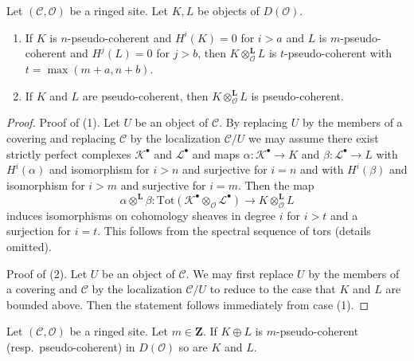 \begin{lemma}
\label{lemma-tensor-pseudo-coherent}
Let $(\mathcal{C}, \mathcal{O})$ be a ringed site. Let $K, L$ be objects
of $D(\mathcal{O})$.
\begin{enumerate}
\item If $K$ is $n$-pseudo-coherent and $H^i(K) = 0$ for $i > a$
and $L$ is $m$-pseudo-coherent and $H^j(L) = 0$ for $j > b$, then
$K \otimes_\mathcal{O}^\mathbf{L} L$ is $t$-pseudo-coherent
with $t = \max(m + a, n + b)$.
\item If $K$ and $L$ are pseudo-coherent, then
$K \otimes_\mathcal{O}^\mathbf{L} L$ is pseudo-coherent.
\end{enumerate}
\end{lemma}

\begin{proof}
Proof of (1). Let $U$ be an object of $\mathcal{C}$.
By replacing $U$ by the members of a covering
and replacing $\mathcal{C}$ by the localization $\mathcal{C}/U$
we may assume there exist strictly perfect complexes $\mathcal{K}^\bullet$
and $\mathcal{L}^\bullet$ and maps
$\alpha : \mathcal{K}^\bullet \to K$ and
$\beta : \mathcal{L}^\bullet \to L$ with $H^i(\alpha)$ and isomorphism
for $i > n$ and surjective for $i = n$ and with
$H^i(\beta)$ and isomorphism for $i > m$ and surjective for $i = m$.
Then the map
$$
\alpha \otimes^\mathbf{L} \beta :
\text{Tot}(\mathcal{K}^\bullet \otimes_\mathcal{O} \mathcal{L}^\bullet)
\to K \otimes_\mathcal{O}^\mathbf{L} L
$$
induces isomorphisms on cohomology sheaves in degree $i$ for
$i > t$ and a surjection for $i = t$. This follows from the
spectral sequence of tors (details omitted).

\medskip\noindent
Proof of (2). Let $U$ be an object of $\mathcal{C}$.
We may first replace $U$ by the members of a covering
and $\mathcal{C}$ by the localization $\mathcal{C}/U$
to reduce to the case that $K$ and $L$ are bounded above.
Then the statement follows immediately from case (1).
\end{proof}

\begin{lemma}
\label{lemma-summands-pseudo-coherent}
Let $(\mathcal{C}, \mathcal{O})$ be a ringed site. Let $m \in \mathbf{Z}$.
If $K \oplus L$ is $m$-pseudo-coherent (resp.\ pseudo-coherent)
in $D(\mathcal{O})$ so are $K$ and $L$.
\end{lemma}

